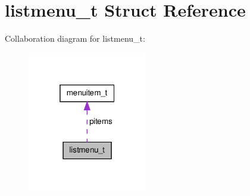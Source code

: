 \hypertarget{structlistmenu__t}{\section{listmenu\-\_\-t \-Struct \-Reference}
\label{structlistmenu__t}
}


\-Collaboration diagram for listmenu\-\_\-t\-:\nopagebreak
\begin{figure}[H]
\begin{center}
\leavevmode
\includegraphics[width=148pt]{structlistmenu__t__coll__graph}
\end{center}
\end{figure}
